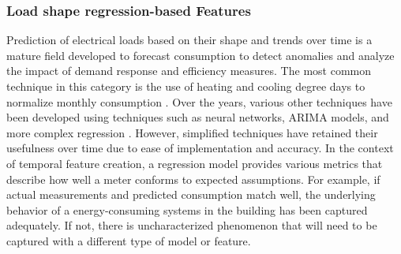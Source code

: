 \subsubsection{Load shape regression-based Features}
\label{sec:regressionmetrics}

Prediction of electrical loads based on their shape and trends over time is a mature field developed to forecast consumption to detect anomalies and analyze the impact of demand response and efficiency measures. The most common technique in this category is the use of heating and cooling degree days to normalize monthly consumption \cite{fels_prism:_1986}. Over the years, various other techniques have been developed using techniques such as neural networks, ARIMA models, and more complex regression \cite{taylor_comparison_2006}. However, simplified techniques have retained their usefulness over time due to ease of implementation and accuracy. In the context of temporal feature creation, a regression model provides various metrics that describe how well a meter conforms to expected assumptions. For example, if actual measurements and predicted consumption match well, the underlying behavior of a energy-consuming systems in the building has been captured adequately. If not, there is uncharacterized phenomenon that will need to be captured with a different type of model or feature. 

